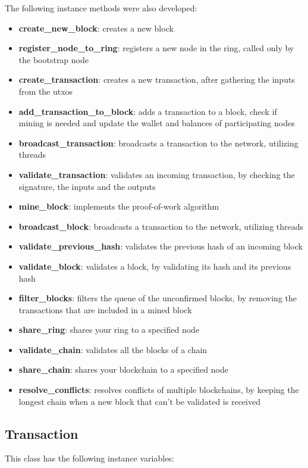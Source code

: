 \documentclass[conference]{IEEEtran}
\begin{document}
The following instance methods were also developed:

\begin{itemize}
\item \textbf{create\_new\_block}: creates a new block
\item \textbf{register\_node\_to\_ring}: registers a new node in the ring, called only by the bootstrap node
\item \textbf{create\_transaction}: creates a new transaction, after gathering the inputs from the utxos
\item \textbf{add\_transaction\_to\_block}: adds a transaction to a block, check if mining is needed and update the wallet and balances of participating nodes
\item \textbf{broadcast\_transaction}: broadcasts a transaction to the network, utilizing threads
\item \textbf{validate\_transaction}: validates an incoming transaction, by checking the signature, the inputs and the outputs
\item \textbf{mine\_block}: implements the proof-of-work algorithm
\item \textbf{broadcast\_block}: broadcasts a transaction to the network, utilizing threads
\item \textbf{validate\_previous\_hash}: validates the previous hash of an incoming block
\item \textbf{validate\_block}: validates a block, by validating its hash and its previous hash
\item \textbf{filter\_blocks}: filters the queue of the unconfirmed blocks, by removing the transactions that are included in a mined block
\item \textbf{share\_ring}: shares your ring to a specified node
\item \textbf{validate\_chain}: validates all the blocks of a chain
\item \textbf{share\_chain}: shares your blockchain to a specified node
\item \textbf{resolve\_conflicts}: resolves conflicts of multiple blockchains, by keeping the longest chain when a new block that can't be validated is received
\end{itemize}

\subsection{Transaction}
This class has the following instance variables:
\end{document}
